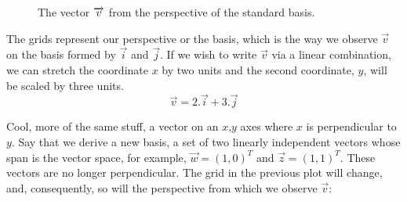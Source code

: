 \documentclass[a4,12pt,twosided,openany]{memoir}
\begin{document}
\begin{figure}[h!]
\begin{center}
\end{center}
\vspace*{3pt}
\caption{The vector $\protect\overrightarrow{v}$ from the perspective of the standard basis.}
\end{figure}
\newpage
\par 
\indent
The grids represent our perspective or the basis, which is the way we observe $\overrightarrow{v}$ on the basis formed by $\overrightarrow{i}$ and $\overrightarrow{j}$. If we wish to write $\overrightarrow{v}$ via a linear combination, we can stretch the coordinate $x$ by two units and the second coordinate, $y$, will be scaled by three units.
\[ \overrightarrow{v} = 2.\overrightarrow{i} + 3.\overrightarrow{j} \]
\par 
\indent
Cool, more of the same stuff, a vector on an $x$,$y$ axes where $x$ is perpendicular to $y$. Say that we derive a new basis, a set of two linearly independent vectors whose span is the vector space, for example, $\overrightarrow{w} = (1,0)^T$ and $\overrightarrow{z} = (1,1)^T$. These vectors are no longer perpendicular. The grid in the previous plot will change, and, consequently, so will the perspective from which we observe $\overrightarrow{v}$:
\end{document}
